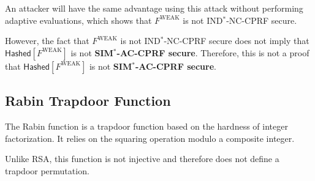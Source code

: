 \documentclass[9pt]{extarticle}
\begin{document}
\begin{itemize}
An attacker will have the same advantage using this attack without performing adaptive evaluations, which shows that $F^{\text{WEAK}}$ is not IND$^*$-NC-CPRF secure.

\end{itemize}

However, the fact that $F^{\text{WEAK}}$ is not IND$^*$-NC-CPRF secure does not imply that $\textsf{Hashed}[F^{\text{WEAK}}]$ is not \textbf{SIM$^*$-AC-CPRF secure}. Therefore, this is not a proof that $\textsf{Hashed}[F^{\text{WEAK}}]$ is not \textbf{SIM$^*$-AC-CPRF secure}.

\subsection{Rabin Trapdoor Function}

The Rabin function is a trapdoor function based on the hardness of integer factorization. It relies on the squaring operation modulo a composite integer.

Unlike RSA, this function is not injective and therefore does not define a trapdoor permutation.
\end{document}
